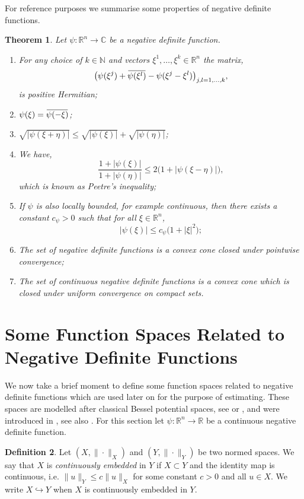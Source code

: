 \documentclass[a4paper, 12pt]{report}
\newtheorem{theorem}{Theorem}[section]
\theoremstyle{remark}
\theoremstyle{definition}
\newtheorem{definition}[theorem]{Definition}
\newcommand{\overbar}[1]{\mkern 1.5mu\overline{\mkern-1.5mu#1\mkern-1.5mu}\mkern 1.5mu}
\begin{document}
For reference purposes we summarise some properties of negative definite functions.
\begin{theorem}\label{FTaSNDFT1}
Let $\psi : \mathbb{R}^n \to \mathbb{C}$ be a negative definite function.
\begin{enumerate}
\item For any choice of $k \in \mathbb{N}$ and vectors $\xi^1, \dots, \xi^k \in \mathbb{R}^n$ the matrix,
$$
\big(\psi(\xi^j) + \overbar{\psi(\xi^l)} - \psi(\xi^j - \xi^l)\big)_{j, l = 1, \dots, k},
$$
is positive Hermitian;

\item $\psi(\xi) = \overbar{\psi(-\xi)}$;

\item $\sqrt{|\psi(\xi + \eta)|} \le \sqrt{|\psi(\xi)|} + \sqrt{|\psi(\eta)|}$;

\item We have,
$$
\frac{1 + |\psi(\xi)|}{1 + |\psi(\eta)|} \le 2\big(1 + |\psi(\xi - \eta)|\big),
$$
which is known as Peetre's inequality;

\item If $\psi$ is also locally bounded, for example continuous, then there exists a constant $c_\psi > 0$ such that for all $\xi \in \mathbb{R}^n$,
$$
|\psi(\xi)| \le c_\psi\big(1 + |\xi|^2\big);
$$

\item The set of negative definite functions is a convex cone closed under pointwise convergence;

\item The set of continuous negative definite functions is a convex cone which is closed under uniform convergence on compact sets.
\end{enumerate}
\end{theorem}


\section{Some Function Spaces Related to Negative Definite Functions}

We now take a brief moment to define some function spaces related to negative definite functions which are used later on for the purpose of estimating.  These spaces are modelled after classical Bessel potential spaces, see \cite{I.1} or \cite{II.256}, and were introduced in \cite{II.256}, see also \cite{II.87}.  For this section let $\psi : \mathbb{R}^n \to \mathbb{R}$ be a continuous negative definite function.
\begin{definition}
Let $(X, \|\cdot\|_X)$ and $(Y, \|\cdot\|_Y)$ be two normed spaces.  We say that $X$ is \emph{continuously embedded} in $Y$ if $X \subset Y$ and the identity map is continuous, i.e. $\|u\|_Y \le c\|u\|_X$ for some constant $c > 0$ and all $u \in X$.  We write $X \hookrightarrow Y$ when $X$ is continuously embedded in $Y$.
\end{definition}
\end{document}
